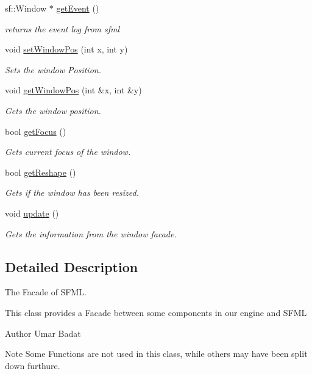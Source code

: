 \begin{DoxyCompactItemize}
sf\-::\-Window $\ast$ \hyperlink{class_s_f_m_l___facade_a09e484b954d3b6a1a1590860f80e022b}{get\-Event} ()
\begin{DoxyCompactList}\small\item\em returns the event log from sfml \end{DoxyCompactList}\item 
void \hyperlink{class_s_f_m_l___facade_a1ba95a94ef28178eef51e765f9c1df77}{set\-Window\-Pos} (int x, int y)
\begin{DoxyCompactList}\small\item\em Sets the window Position. \end{DoxyCompactList}\item 
void \hyperlink{class_s_f_m_l___facade_af2468f9018f13e29335253aa93940b89}{get\-Window\-Pos} (int \&x, int \&y)
\begin{DoxyCompactList}\small\item\em Gets the window position. \end{DoxyCompactList}\item 
bool \hyperlink{class_s_f_m_l___facade_ab9589b861c25532a4a397e87d5dde5f2}{get\-Focus} ()
\begin{DoxyCompactList}\small\item\em Gets current focus of the window. \end{DoxyCompactList}\item 
bool \hyperlink{class_s_f_m_l___facade_a565762751ecd44eaad03e3ed6329954e}{get\-Reshape} ()
\begin{DoxyCompactList}\small\item\em Gets if the window has been resized. \end{DoxyCompactList}\item 
void \hyperlink{class_s_f_m_l___facade_a1e338ffadc16f2b5b462ac8cf37f4a1b}{update} ()
\begin{DoxyCompactList}\small\item\em Gets the information from the window facade. \end{DoxyCompactList}\end{DoxyCompactItemize}


\subsection{Detailed Description}
The Facade of S\-F\-M\-L. 

This class provides a Facade between some components in our engine and S\-F\-M\-L \begin{DoxyAuthor}{Author}
Umar Badat 
\end{DoxyAuthor}
\begin{DoxyNote}{Note}
Some Functions are not used in this class, while others may have been split down furthure. 
\end{DoxyNote}


